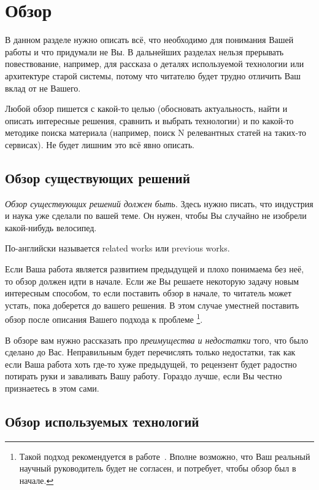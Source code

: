 
\section{Обзор}
\label{sec:relatedworks}

В данном разделе нужно описать всё, что необходимо для понимания Вашей работы и что придумали не Вы.
В дальнейших разделах нельзя прерывать повествование, например, для рассказа о деталях используемой технологии или архитектуре старой системы, потому что читателю будет трудно отличить Ваш вклад от не Вашего.

Любой обзор пишется с какой-то целью (обосновать актуальность, найти и описать интересные решения, сравнить и выбрать технологии) и по какой-то методике поиска материала (например, поиск N релевантных статей на таких-то сервисах).
Не будет лишним это всё явно описать.

\subsection{Обзор существующих решений}

\emph{Обзор существующих решений должен быть.}
Здесь нужно писать, что индустрия и наука уже сделали по вашей теме.
Он нужен, чтобы Вы случайно не изобрели какой-нибудь велосипед.

По-английски называется related works или previous works.

Если Ваша работа является развитием предыдущей и плохо понима\-ема без неё, то обзор должен идти в начале.
Если же Вы решаете некоторую задачу новым интересным способом, то если поставить обзор в начале, то читатель может устать, пока доберется до вашего решения.
В этом случае уместней поставить обзор после описания Вашего подхода к проблеме%
\footnote{Такой подход рекомендуется в работе~\cite{SPJGreatPaper}.
    Вполне возможно, что Ваш реальный научный руководитель будет не согласен, и потребует, чтобы обзор был в начале.}.

В обзоре вам нужно рассказать про \emph{преимущества и недостатки} того, что было сделано до Вас.
Неправильным будет перечислять только недостатки, так как если Ваша работа хоть где-то хуже предыдущей, то рецензент будет радостно потирать руки и заваливать Вашу работу.
Гораздо лучше, если Вы честно признаетесь в этом сами.

\subsection{Обзор используемых технологий}

